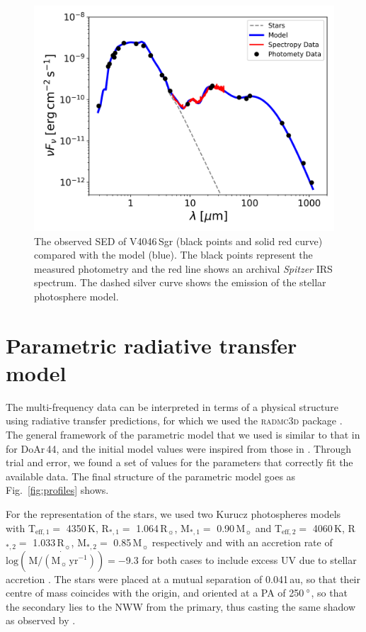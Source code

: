 \documentclass[letters,usenatbib,times]{mnras}
\begin{document}
\begin{figure}
	\centering
	\includegraphics[width=\columnwidth]{SED_.png}
    \caption{The observed SED of V4046\,Sgr (black points and solid red curve) compared with the model (blue). The black points represent the measured photometry and the red line shows an archival \textit{Spitzer} IRS spectrum. The dashed silver curve shows the emission of the stellar photosphere model.}
    \label{fig:SED}
\end{figure}

\section{Parametric radiative transfer model} \label{sec:model}

The multi-frequency data can be interpreted in terms of a physical structure using radiative transfer predictions, for which we used the \textsc{radmc3d} package \citep{Dullemond_2012}. The general framework of the parametric model that we used is similar to that in \citet{2018MNRAS.477.5104C} for DoAr\,44, and the initial model values were inspired from those in \citet{Rosenfeld_2013}. Through trial and error, we found a set of values for the parameters that correctly fit the available data. The final structure of the parametric model goes as Fig.~\ref{fig:profiles} shows.

For the representation of the stars, we used two Kurucz photospheres models \citep{1979ApJS...40....1K, 1997A&A...318..841C} with T$_{\mathrm{eff},1} =$ 4350\,K, R$_{*,1} =$ 1.064\,R$_{\sun}$, M$_{*,1} =$ 0.90\,M$_{\sun}$ and T$_{\mathrm{eff},2} =$ 4060\,K, R$_{*,2} =$ 1.033\,R$_{\sun}$, M$_{*,2} =$ 0.85\,M$_{\sun}$ respectively and with an accretion rate of $\mathrm{log}(\,\dot{\mathrm{M}/(\mathrm{M}_{\sun}\,\mathrm{yr^{-1}})}) = -$9.3 for both cases to include excess UV due to stellar accretion \citep{10.1111/j.1365-2966.2011.19366.x}. The stars were placed at a mutual separation of 0.041\,au, so that their centre of mass coincides with the origin, and oriented at a PA of 250\,$\hbox{$^\circ$}$, so that the secondary lies to the NWW from the primary, thus casting the same shadow as observed by \citet{dOrazi}.
\end{document}
